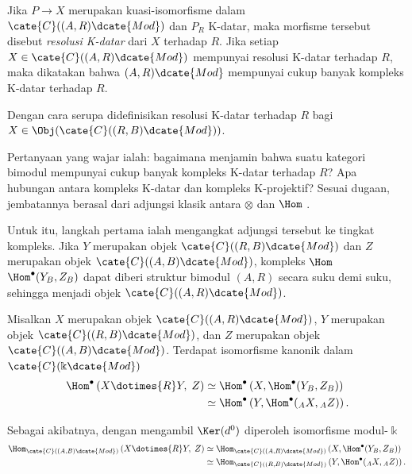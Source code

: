 \begin{definisi}
	Jika $P\to X$ merupakan kuasi-isomorfisme dalam
	$\cate{C}((A,R)\dcate{Mod})$ dan $P_R$ K-datar, maka morfisme tersebut
	disebut \emph{resolusi K-datar} dari $X$ terhadap $R$. Jika setiap
	$X\in\cate{C}((A,R)\dcate{Mod})$ mempunyai resolusi K-datar terhadap $R$,
	maka dikatakan bahwa $(A,R)\dcate{Mod}$ mempunyai cukup banyak kompleks
	K-datar terhadap $R$.

	Dengan cara serupa didefinisikan resolusi K-datar terhadap $R$ bagi
	$X\in\Obj(\cate{C}((R,B)\dcate{Mod}))$.
\end{definisi}

Pertanyaan yang wajar ialah: bagaimana menjamin bahwa suatu kategori bimodul
mempunyai cukup banyak kompleks K-datar terhadap $R$? Apa hubungan antara
kompleks K-datar dan kompleks K-projektif? Sesuai dugaan, jembatannya
berasal dari adjungsi klasik antara $\otimes$ dan $\Hom$
\cite[Teorema 6.6.5]{Li1}.

Untuk itu, langkah pertama ialah mengangkat adjungsi tersebut ke tingkat
kompleks. Jika $Y$ merupakan objek $\cate{C}((R,B)\dcate{Mod})$ dan $Z$
merupakan objek $\cate{C}((A,B)\dcate{Mod})$, kompleks $\Hom$
$\Hom^\bullet(Y_B,Z_B)$ dapat diberi struktur bimodul $(A,R)$ secara suku demi
suku, sehingga menjadi objek $\cate{C}((A,R)\dcate{Mod})$.

\begin{proposisi}\label{prop:tensor-Hom-cplx}
	Misalkan $X$ merupakan objek $\cate{C}((A,R)\dcate{Mod})$, $Y$ merupakan
	objek $\cate{C}((R,B)\dcate{Mod})$, dan $Z$ merupakan objek
	$\cate{C}((A,B)\dcate{Mod})$. Terdapat isomorfisme kanonik dalam
	$\cate{C}(\Bbbk\dcate{Mod})$
	\begin{align*}
		\Hom^\bullet\left( X \dotimes{R} Y, \; Z \right) & \simeq \Hom^\bullet\left( X, \Hom^\bullet(Y_B, Z_B) \right) \\
		& \simeq \Hom^\bullet\left( Y, \Hom^\bullet({}_A X, {}_A Z) \right).
	\end{align*}

	Sebagai akibatnya, dengan mengambil $\Ker(d^0)$ diperoleh isomorfisme
	modul-$\Bbbk$
	\begin{align*}
		\Hom_{\cate{C}((A, B)\dcate{Mod})}\left( X \dotimes{R} Y, \; Z \right) & \simeq \Hom_{\cate{C}((A, R)\dcate{Mod})}\left( X, \Hom^\bullet(Y_B, Z_B) \right) \\
		& \simeq \Hom_{\cate{C}((R, B)\dcate{Mod})}\left( Y, \Hom^\bullet({}_A X, {}_A Z) \right).
	\end{align*}
\end{proposisi}

